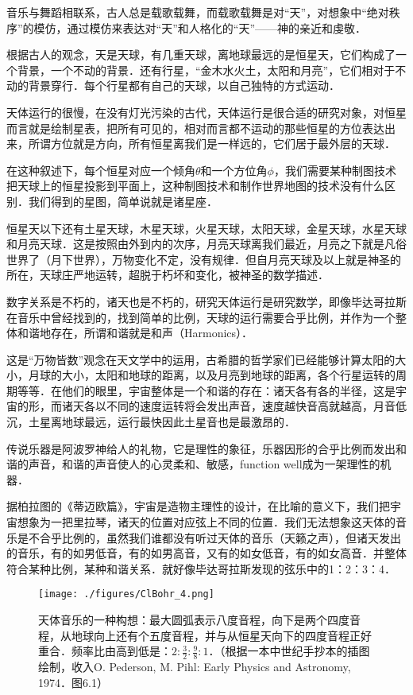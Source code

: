 音乐与舞蹈相联系，古人总是载歌载舞，而载歌载舞是对“天”，对想象中“绝对秩序”的模仿，通过模仿来表达对“天”和人格化的“天”——神的亲近和虔敬．

根据古人的观念，天是天球，有几重天球，离地球最远的是恒星天，它们构成了一个背景，一个不动的背景．还有行星，“金木水火土，太阳和月亮”，它们相对于不动的背景穿行．每个行星都有自己的天球，以自己独特的方式运动．

天体运行的很慢，在没有灯光污染的古代，天体运行是很合适的研究对象，对恒星而言就是绘制星表，把所有可见的，相对而言都不运动的那些恒星的方位表达出来，所谓方位就是方向，所有恒星离我们是一样远的，它们居于最外层的天球．

在这种叙述下，每个恒星对应一个倾角$\theta $和一个方位角$\phi $，我们需要某种制图技术把天球上的恒星投影到平面上，这种制图技术和制作世界地图的技术没有什么区别．我们得到的星图，简单说就是诸星座．

恒星天以下还有土星天球，木星天球，火星天球，太阳天球，金星天球，水星天球和月亮天球．这是按照由外到内的次序，月亮天球离我们最近，月亮之下就是凡俗世界了（月下世界），万物变化不定，没有规律．但自月亮天球及以上就是神圣的所在，天球庄严地运转，超脱于朽坏和变化，被神圣的数学描述．

数字关系是不朽的，诸天也是不朽的，研究天体运行是研究数学，即像毕达哥拉斯在音乐中曾经找到的，找到简单的比例，天球的运行需要合乎比例，并作为一个整体和谐地存在，所谓和谐就是和声（Harmonics）．

这是“万物皆数”观念在天文学中的运用，古希腊的哲学家们已经能够计算太阳的大小，月球的大小，太阳和地球的距离，以及月亮到地球的距离，各个行星运转的周期等等．在他们的眼里，宇宙整体是一个和谐的存在：诸天各有各的半径，这是宇宙的形，而诸天各以不同的速度运转将会发出声音，速度越快音高就越高，月音低沉，土星离地球最远，运行最快因此土星音也是最激昂的．

传说乐器是阿波罗神给人的礼物，它是理性的象征，乐器因形的合乎比例而发出和谐的声音，和谐的声音使人的心灵柔和、敏感，function well成为一架理性的机器．

据柏拉图的《蒂迈欧篇》，宇宙是造物主理性的设计，在比喻的意义下，我们把宇宙想象为一把里拉琴，诸天的位置对应弦上不同的位置．我们无法想象这天体的音乐是不合乎比例的，虽然我们谁都没有听过天体的音乐（天籁之声），但诸天发出的音乐，有的如男低音，有的如男高音，又有的如女低音，有的如女高音．并整体符合某种比例，某种和谐关系．就好像毕达哥拉斯发现的弦乐中的1：2：3：4．

\begin{figure}[ht]
\centering
\texttt{[image: ./figures/ClBohr\_4.png]}
\caption{天体音乐的一种构想：最大圆弧表示八度音程，向下是两个四度音程，从地球向上还有个五度音程，并与从恒星天向下的四度音程正好重合．频率比由高到低是：$2: \frac{3}{2} : \frac{9}{8} : 1$．（根据一本中世纪手抄本的插图绘制，收入O. Pederson, M. Pihl: Early Physics and Astronomy, 1974．图6.1）} \label{ClBohr_fig4}
\end{figure}

